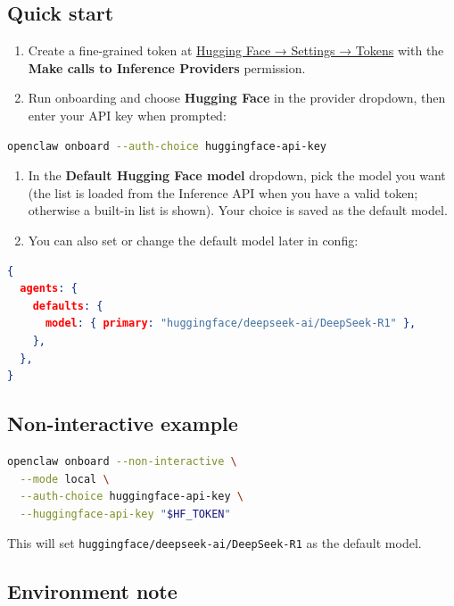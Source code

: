 \subsection{Quick start}


\begin{enumerate}
  \item Create a fine-grained token at \href{https://huggingface.co/settings/tokens/new?ownUserPermissions=inference.serverless.write\&tokenType=fineGrained}{Hugging Face → Settings → Tokens} with the \textbf{Make calls to Inference Providers} permission.
  \item Run onboarding and choose \textbf{Hugging Face} in the provider dropdown, then enter your API key when prompted:
\end{enumerate}


\begin{lstlisting}[language=bash]
openclaw onboard --auth-choice huggingface-api-key
\end{lstlisting}


\begin{enumerate}
  \item In the \textbf{Default Hugging Face model} dropdown, pick the model you want (the list is loaded from the Inference API when you have a valid token; otherwise a built-in list is shown). Your choice is saved as the default model.
  \item You can also set or change the default model later in config:
\end{enumerate}


\begin{lstlisting}[language=json]
{
  agents: {
    defaults: {
      model: { primary: "huggingface/deepseek-ai/DeepSeek-R1" },
    },
  },
}
\end{lstlisting}


\subsection{Non-interactive example}


\begin{lstlisting}[language=bash]
openclaw onboard --non-interactive \
  --mode local \
  --auth-choice huggingface-api-key \
  --huggingface-api-key "$HF_TOKEN"
\end{lstlisting}


This will set \texttt{huggingface/deepseek-ai/DeepSeek-R1} as the default model.

\subsection{Environment note}


